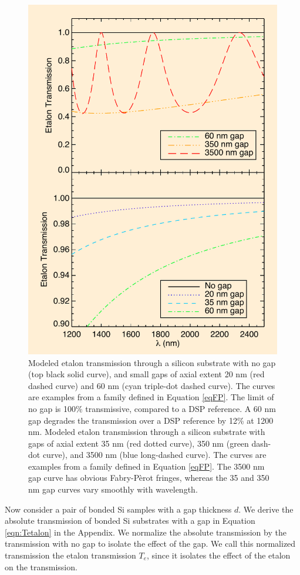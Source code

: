 \documentclass[osajnl,preprint,showpacs,superscriptaddress,12pt]{revtex4-1} %
\begin{document}
\begin{figure}[htbp]
\centerline{\includegraphics[width=0.65\columnwidth]{figs/Rel_etalon_trans_stack.pdf}}
\caption{Modeled etalon transmission through a silicon substrate with no gap (top black solid curve), and small gaps of axial extent 20 nm (red dashed curve) and 60 nm (cyan triple-dot dashed curve)\label{figEtalonRelTrans}.  The curves are examples from a family defined in Equation \ref{eqFP}.   The limit of no gap is 100\% transmissive, compared to a DSP reference.  A 60 nm gap degrades the transmission over a DSP reference by 12\% at 1200 nm. Modeled etalon transmission through a silicon substrate with gaps of axial extent 35 nm (red dotted curve), 350 nm (green dash-dot curve), and 3500 nm (blue long-dashed curve).  The curves are examples from a family defined in Equation \ref{eqFP}.  The 3500 nm gap curve has obvious Fabry-P\`erot fringes, whereas the 35 and 350 nm gap curves vary smoothly with wavelength.}
\end{figure}

Now consider a pair of bonded Si samples with a gap thickness $d$. We derive the absolute transmission of bonded Si substrates with a gap in Equation \ref{eqn:Tetalon} in the Appendix.  We normalize the absolute transmission by the transmission with no gap to isolate the effect of the gap.  We call this normalized transmission the etalon transmission $T_{e}$, since it isolates the effect of the etalon on the transmission.
\end{document}

